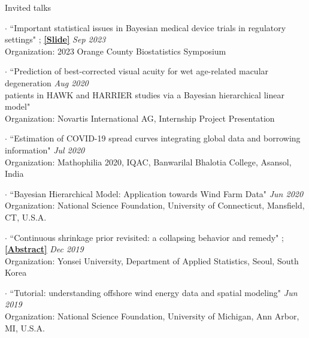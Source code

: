 \documentclass[
	11pt, %
]{resume} %
\begin{document}
\begin{rSection}{Invited talks}
\item[$\cdot$]
{``Important statistical issues in Bayesian medical device trials in regulatory settings"}
;
\href{https://drive.google.com/file/d/1pHxwp4T9Nq2EKNrlxqzy1VxmxcZAERH-/view}
{\underline{\textbf{[Slide]}}}
\hfill {\em Sep 2023}
\\
Organization: 2023 Orange County  Biostatistics Symposium

\item[$\cdot$]
{``Prediction of best-corrected visual acuity for wet age-related macular degeneration}  \hfill {\em Aug 2020}
\\
{ patients in HAWK and HARRIER studies via a Bayesian hierarchical linear model"}
\\
Organization: Novartis International AG, Internship Project Presentation

\item[$\cdot$]
{``Estimation of COVID-19 spread curves integrating global data and borrowing  information"}  \hfill {\em Jul 2020}
\\
Organization: Mathophilia 2020, IQAC, Banwarilal Bhalotia College, Asansol, India


\item[$\cdot$]
{``Bayesian Hierarchical Model: Application towards Wind
Farm Data"}  \hfill {\em Jun 2020}
\\
Organization: National Science Foundation, University of Connecticut, Mansfield, CT, U.S.A.

\item[$\cdot$]
{``Continuous shrinkage prior revisited: a collapsing behavior and remedy"}  
;
\href{https://stat.yonsei.ac.kr/stat/board/grad_notice.do?mode=view&articleNo=76831&article.offset=0&articleLimit=10}
{\underline{\textbf{[Abstract]}}}
\hfill {\em Dec 2019}
\\
Organization: Yonsei University, Department of Applied Statistics, Seoul, South Korea


\item[$\cdot$]
{``Tutorial: understanding offshore wind energy data and spatial modeling"}  \hfill {\em Jun 2019}
\\
Organization: National Science Foundation, University of Michigan, Ann Arbor, MI, U.S.A.
\end{rSection}
\end{document}
